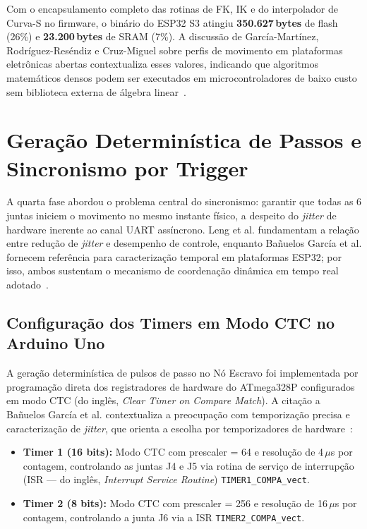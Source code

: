 Com o encapsulamento completo das rotinas de FK, IK e do interpolador de Curva-S no firmware, o binário do ESP32 S3 atingiu \textbf{350.627\,bytes} de flash (26\%) e \textbf{23.200\,bytes} de SRAM (7\%). A discussão de García-Martínez, Rodríguez-Reséndiz e Cruz-Miguel sobre perfis de movimento em plataformas eletrônicas abertas contextualiza esses valores, indicando que algoritmos matemáticos densos podem ser executados em microcontroladores de baixo custo sem biblioteca externa de álgebra linear~\cite{garcia2019new}.

\section{Geração Determinística de Passos e Sincronismo por Trigger}
\label{sec:dev_trigger}

A quarta fase abordou o problema central do sincronismo: garantir que todas as 6 juntas iniciem o movimento no mesmo instante físico, a despeito do \textit{jitter} de hardware inerente ao canal UART assíncrono. Leng et al. fundamentam a relação entre redução de \textit{jitter} e desempenho de controle, enquanto Bañuelos García et al. fornecem referência para caracterização temporal em plataformas ESP32; por isso, ambos sustentam o mecanismo de coordenação dinâmica em tempo real adotado~\cite{leng2014improving, banuelos2026timing}.

\subsection{Configuração dos Timers em Modo CTC no Arduino Uno}
\label{subsec:dev_trigger_timers}

A geração determinística de pulsos de passo no Nó Escravo foi implementada por programação direta dos registradores de hardware do ATmega328P configurados em modo CTC (do inglês, \textit{Clear Timer on Compare Match}). A citação a Bañuelos García et al. contextualiza a preocupação com temporização precisa e caracterização de \textit{jitter}, que orienta a escolha por temporizadores de hardware~\cite{banuelos2026timing}:

\begin{itemize}
    \item \textbf{Timer 1 (16 bits):} Modo CTC com prescaler = 64 e resolução de 4\,$\mu$s por contagem, controlando as juntas J4 e J5 via rotina de serviço de interrupção (ISR --- do inglês, \textit{Interrupt Service Routine}) \texttt{TIMER1\_COMPA\_vect}.
    \item \textbf{Timer 2 (8 bits):} Modo CTC com prescaler = 256 e resolução de 16\,$\mu$s por contagem, controlando a junta J6 via a ISR \texttt{TIMER2\_COMPA\_vect}.
\end{itemize}

